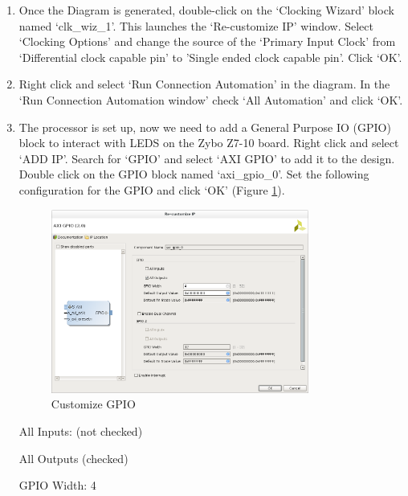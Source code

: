 \documentclass[11pt,twoside,titlepage]{article}
\begin{document}
\begin{enumerate}
\begin{enumerate}
			\item  Once the Diagram is generated, double-click on the `Clocking Wizard' block named `clk\_wiz\_1'. This launches the `Re-customize IP' window. Select `Clocking Options' and change the source of the `Primary Input Clock' from `Differential clock capable pin' to 'Single ended clock capable pin'. Click `OK'.  
			\item Right click and select `Run Connection Automation' in the diagram. In the `Run Connection Automation window' check `All Automation' and click `OK'. 
			\item The processor is set up, now we need to add a General Purpose IO (GPIO) block to interact with LEDS on the Zybo Z7-10 board. Right click and select `ADD IP'. Search for `GPIO' and select `AXI GPIO' to add it to the design. Double click on the GPIO block named `axi\_gpio\_0'. Set the following configuration for the GPIO and click `OK'
			(Figure \ref{gpio}).   
			\begin{figure}[h]
				\begin{center}
					\includegraphics[width=0.8\textwidth]{lab2GPIOconf}
					\caption{Customize GPIO}
					\label{gpio}
				\end{center}
			\end{figure} 
			
			All Inputs: (not checked)
			
			All Outputs (checked)
			
			GPIO Width: 4
			

\end{enumerate}
\end{enumerate}
\end{document}
